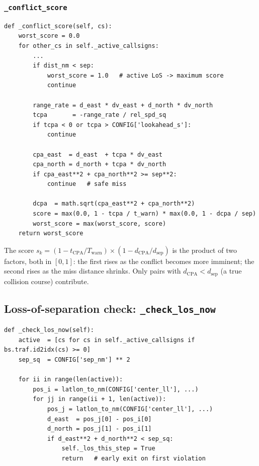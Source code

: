 \documentclass[11pt, a4paper]{article}
\begin{document}
\subsubsection{\texttt{\_conflict\_score}}
\label{sec:conflict_score}

\begin{lstlisting}[caption={Computing the worst conflict score across all intruders.}]
def _conflict_score(self, cs):
    worst_score = 0.0
    for other_cs in self._active_callsigns:
        ...
        if dist_nm < sep:
            worst_score = 1.0   # active LoS -> maximum score
            continue

        range_rate = d_east * dv_east + d_north * dv_north
        tcpa       = -range_rate / rel_spd_sq
        if tcpa < 0 or tcpa > CONFIG['lookahead_s']:
            continue

        cpa_east  = d_east  + tcpa * dv_east
        cpa_north = d_north + tcpa * dv_north
        if cpa_east**2 + cpa_north**2 >= sep**2:
            continue   # safe miss

        dcpa  = math.sqrt(cpa_east**2 + cpa_north**2)
        score = max(0.0, 1 - tcpa / t_warn) * max(0.0, 1 - dcpa / sep)
        worst_score = max(worst_score, score)
    return worst_score
\end{lstlisting}

The score $s_k = (1 - t_\text{CPA}/T_\text{warn}) \times (1 - d_\text{CPA}/d_\text{sep})$
is the product of two factors, both in $[0,1]$:
the first rises as the conflict becomes more imminent;
the second rises as the miss distance shrinks.
Only pairs with $d_\text{CPA} < d_\text{sep}$ (a true collision course) contribute.

\subsection{Loss-of-separation check: \texttt{\_check\_los\_now}}

\begin{lstlisting}[caption={Geometric LoS check run after each 5-second simulation window.}]
def _check_los_now(self):
    active  = [cs for cs in self._active_callsigns if bs.traf.id2idx(cs) >= 0]
    sep_sq  = CONFIG['sep_nm'] ** 2

    for ii in range(len(active)):
        pos_i = latlon_to_nm(CONFIG['center_ll'], ...)
        for jj in range(ii + 1, len(active)):
            pos_j = latlon_to_nm(CONFIG['center_ll'], ...)
            d_east  = pos_j[0] - pos_i[0]
            d_north = pos_j[1] - pos_i[1]
            if d_east**2 + d_north**2 < sep_sq:
                self._los_this_step = True
                return   # early exit on first violation
\end{lstlisting}
\end{document}
